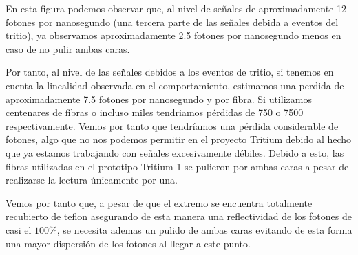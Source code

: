 En esta figura podemos observar que, al nivel de señales de aproximadamente 12 fotones por nanosegundo (una tercera parte de las señales debida a eventos del tritio), ya observamos aproximadamente 2.5 fotones por nanosegundo menos en caso de no pulir ambas caras.

Por tanto, al nivel de las señales debidos a los eventos de tritio, si tenemos en cuenta la linealidad observada en el comportamiento, estimamos una perdida de aproximadamente 7.5 fotones por nanosegundo y por fibra. Si utilizamos centenares de fibras o incluso miles tendriamos pérdidas de 750 o 7500 respectivamente. Vemos por tanto que tendríamos una pérdida considerable de fotones, algo que no nos podemos permitir en el proyecto Tritium debido al hecho que ya estamos trabajando con señales excesivamente débiles. Debido a esto, las fibras utilizadas en el prototipo Tritium 1 se pulieron por ambas caras a pesar de realizarse la lectura únicamente por una.

Vemos por tanto que, a pesar de que el extremo se encuentra totalmente recubierto de teflon asegurando de esta manera una reflectividad de los fotones de casi el $100\%$, se necesita ademas un pulido de ambas caras evitando de esta forma una mayor dispersión de los fotones al llegar a este punto. 




